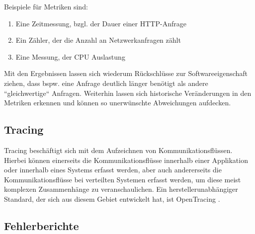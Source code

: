 Beispiele für Metriken sind:

\begin{enumerate}
	\item Eine Zeitmessung, bzgl. der Dauer einer HTTP-Anfrage
	\item Ein Zähler, der die Anzahl an Netzwerkanfragen zählt
	\item Eine Messung, der CPU Auslastung
\end{enumerate}

Mit den Ergebnissen lassen sich wiederum Rückschlüsse zur Softwareeigenschaft ziehen, dass bspw. eine Anfrage deutlich länger benötigt als andere ``gleichwertige`` Anfragen. Weiterhin lassen sich historische Veränderungen in den Metriken erkennen und können so unerwünschte Abweichungen aufdecken.

\subsection{Tracing}

Tracing beschäftigt sich mit dem Aufzeichnen von Kommunikationsflüssen. Hierbei können einerseits die Kommunikationsflüsse innerhalb einer Applikation oder innerhalb eines Systems erfasst werden, aber auch andererseits die Kommunikationsflüsse bei verteilten Systemen erfasst werden, um diese meist komplexen Zusammenhänge zu veranschaulichen. Ein herstellerunabhängiger Standard, der sich aus diesem Gebiet entwickelt hat, ist OpenTracing \cite{OpenTracing}.

\subsection{Fehlerberichte}

